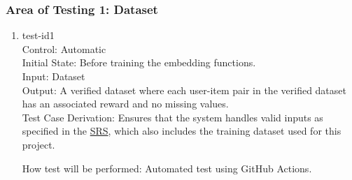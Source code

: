 \documentclass[12pt, titlepage]{article}
\begin{document}
\subsubsection{Area of Testing 1: Dataset}

		










\begin{enumerate}

  \item{test-id1\\}
  Control: Automatic\\
  Initial State: Before training the embedding functions.\\
  Input: Dataset\\
  Output: A verified dataset where each user-item pair in the verified dataset has an associated reward and no missing values.\\
  Test Case Derivation: Ensures that the system handles valid inputs as specified in the \href{https://github.com/V-AS/Two-tower-recommender-system/blob/main/docs/SRS/SRS.pdf}{SRS}, which also includes the training dataset used for this project.

  How test will be performed: Automated test using GitHub Actions.
					
\end{enumerate}
\end{document}

